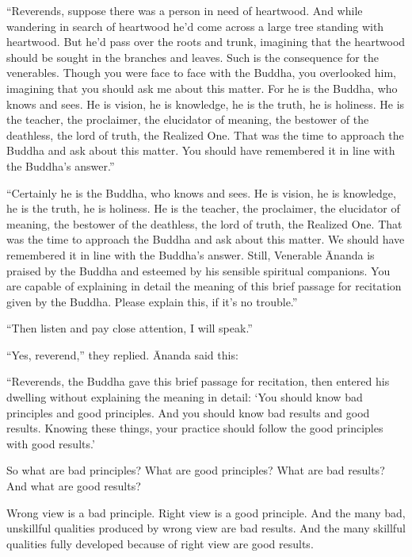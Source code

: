 \documentclass[12pt,openany]{book}%
\begin{document}
“Reverends, suppose there was a person in need of heartwood. And while wandering in search of heartwood he’d come across a large tree standing with heartwood. But he’d pass over the roots and trunk, imagining that the heartwood should be sought in the branches and leaves. Such is the consequence for the venerables. Though you were face to face with the Buddha, you overlooked him, imagining that you should ask me about this matter. For he is the Buddha, who knows and sees. He is vision, he is knowledge, he is the truth, he is holiness. He is the teacher, the proclaimer, the elucidator of meaning, the bestower of the deathless, the lord of truth, the Realized One. That was the time to approach the Buddha and ask about this matter. You should have remembered it in line with the Buddha’s answer.” 

“Certainly he is the Buddha, who knows and sees. He is vision, he is knowledge, he is the truth, he is holiness. He is the teacher, the proclaimer, the elucidator of meaning, the bestower of the deathless, the lord of truth, the Realized One. That was the time to approach the Buddha and ask about this matter. We should have remembered it in line with the Buddha’s answer. Still, Venerable Ānanda is praised by the Buddha and esteemed by his sensible spiritual companions. You are capable of explaining in detail the meaning of this brief passage for recitation given by the Buddha. Please explain this, if it’s no trouble.” 

“Then listen and pay close attention, I will speak.” 

“Yes, reverend,” they replied. Ānanda said this: 

“Reverends, the Buddha gave this brief passage for recitation, then entered his dwelling without explaining the meaning in detail: ‘You should know bad principles and good principles. And you should know bad results and good results. Knowing these things, your practice should follow the good principles with good results.’ 

So what are bad principles? What are good principles? What are bad results? And what are good results? 

Wrong view is a bad principle. Right view is a good principle. And the many bad, unskillful qualities produced by wrong view are bad results. And the many skillful qualities fully developed because of right view are good results. 
\end{document}
